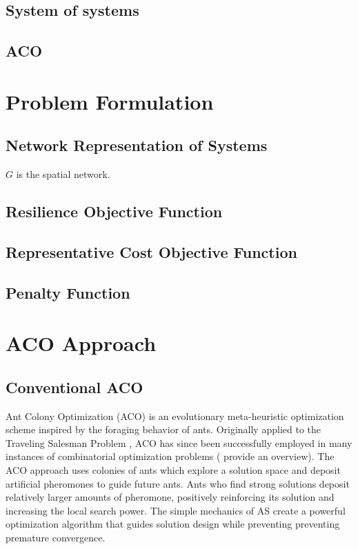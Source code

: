 \documentclass[preprint,12pt,authoryear]{elsarticle}
\begin{document}
\subsection{System of systems}

\subsection{ACO}

\section{Problem Formulation}

\subsection{Network Representation of Systems}

$G$ is the spatial network.


\subsection{Resilience Objective Function}

\subsection{Representative Cost Objective Function}

\subsection{Penalty Function}

\section{ACO Approach}

\subsection{Conventional ACO}
Ant Colony Optimization (ACO) is an evolutionary meta-heuristic optimization scheme inspired by the foraging behavior of ants. Originally applied to the Traveling Salesman Problem \citep{Dorigo1996}, ACO has since been successfully employed in many instances of combinatorial optimization problems (\cite{Dorigo1999} provide an overview). The ACO approach uses colonies of ants which explore a solution space and deposit artificial pheromones to guide future ants. Ants who find strong solutions deposit relatively larger amounts of pheromone, positively reinforcing its solution and increasing the local search power. The simple mechanics of AS create a powerful optimization algorithm that guides solution design while preventing preventing premature convergence. 
\end{document}

